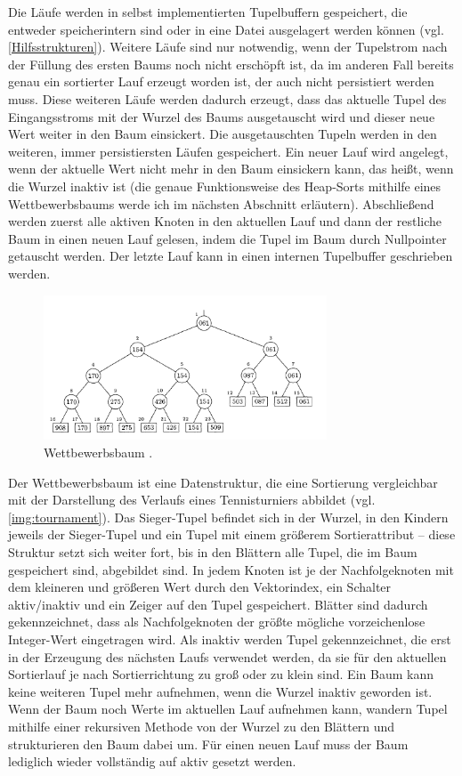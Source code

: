 \documentclass[a4paper,12pt,twoside]{article}
\begin{document}
Die Läufe werden in selbst implementierten Tupelbuffern gespeichert, die entweder speicherintern sind oder in eine Datei ausgelagert werden können (vgl. \autoref{Hilfsstrukturen}). Weitere Läufe sind nur notwendig, wenn der Tupelstrom nach der Füllung des ersten Baums noch nicht erschöpft ist, da im anderen Fall bereits genau ein sortierter Lauf erzeugt worden ist, der auch nicht persistiert werden muss. Diese weiteren Läufe werden dadurch erzeugt, dass das aktuelle Tupel des Eingangsstroms mit der Wurzel des Baums ausgetauscht wird und dieser neue Wert weiter in den Baum einsickert. Die ausgetauschten Tupeln werden in den weiteren, immer persistiersten Läufen gespeichert. Ein neuer Lauf wird angelegt, wenn der aktuelle Wert nicht mehr in den Baum einsickern kann, das heißt, wenn die Wurzel inaktiv ist (die genaue Funktionsweise des Heap-Sorts mithilfe eines Wettbewerbsbaums werde ich im nächsten Abschnitt erläutern). Abschließend werden zuerst alle aktiven Knoten in den aktuellen Lauf und dann der restliche Baum in einen neuen Lauf gelesen, indem die Tupel im Baum durch Nullpointer getauscht werden. Der letzte Lauf kann in einen internen Tupelbuffer geschrieben werden.

\begin{figure}
	\centering
	\includegraphics[width=0.75\textwidth]{Bilder/tournament.png}
	\caption{Wettbewerbsbaum \parencite[S. 253]{Knuth1973}.}
	\label{img:tournament}
\end{figure}

Der Wettbewerbsbaum ist eine Datenstruktur, die eine Sortierung vergleichbar mit der Darstellung des Verlaufs eines Tennisturniers abbildet (vgl. \autoref{img:tournament}). Das Sieger-Tupel befindet sich in der Wurzel, in den Kindern jeweils der Sieger-Tupel und ein Tupel mit einem größerem Sortierattribut -- diese Struktur setzt sich weiter fort, bis in den Blättern alle Tupel, die im Baum gespeichert sind, abgebildet sind. In jedem Knoten ist je der Nachfolgeknoten mit dem kleineren und größeren Wert durch den Vektorindex, ein Schalter aktiv/inaktiv und ein Zeiger auf den Tupel gespeichert. Blätter sind dadurch gekennzeichnet, dass als Nachfolgeknoten der größte mögliche vorzeichenlose Integer-Wert eingetragen wird. Als inaktiv werden Tupel gekennzeichnet, die erst in der Erzeugung des nächsten Laufs verwendet werden, da sie für den aktuellen Sortierlauf je nach Sortierrichtung zu groß oder zu klein sind. Ein Baum kann keine weiteren Tupel mehr aufnehmen, wenn die Wurzel inaktiv geworden ist. Wenn der Baum noch Werte im aktuellen Lauf aufnehmen kann, wandern Tupel mithilfe einer rekursiven Methode von der Wurzel zu den Blättern und strukturieren den Baum dabei um. Für einen neuen Lauf muss der Baum lediglich wieder vollständig auf aktiv gesetzt werden. 
\end{document}

